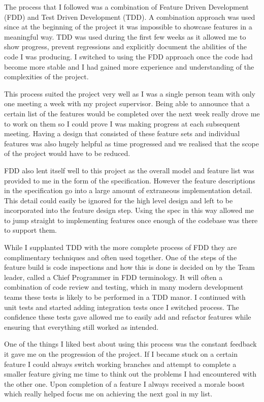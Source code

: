 The process that I followed was a combination of Feature Driven Development (FDD) and Test Driven Development (TDD).
A combination approach was used since at the beginning of the project it was impossible to showcase features in a meaningful way.
TDD was used during the first few weeks as it allowed me to show progress, prevent regressions and explicitly document the abilities of the code I was producing.
I switched to using the FDD approach once the code had become more stable and I had gained more experience and understanding of the complexities of the project.

This process suited the project very well as I was a single person team with only one meeting a week with my project supervisor.
Being able to announce that a certain list of the features would be completed over the next week really drove me to work on them so I could prove I was making progress at each subsequent meeting.
Having a design that consisted of these feature sets and individual features was also hugely helpful as time progressed and we realised that the scope of the project would have to be reduced.

FDD also lent itself well to this project as the overall model and feature list was provided to me in the form of the specification.
However the feature descriptions in the specification go into a large amount of extraneous implementation detail.
This detail could easily be ignored for the high level design and left to be incorporated into the feature design step.
Using the spec in this way allowed me to jump straight to implementing features once enough of the codebase was there to support them.

While I supplanted TDD with the more complete process of FDD they are complimentary techniques and often used together.
One of the steps of the feature build is code inspections and how this is done is decided on by the Team leader, called a Chief Programmer in FDD terminology.
It will often a combination of code review and testing, which in many modern development teams these tests is likely to be performed in a TDD manor.
I continued with unit tests and started adding integration tests once I switched process.
The confidence these tests gave allowed me to easily add and refactor features while ensuring that everything still worked as intended.  

One of the things I liked best about using this process was the constant feedback it gave me on the progression of the project.
If I became stuck on a certain feature I could always switch working branches and attempt to complete a smaller feature giving me time to think out the problems I had encountered with the other one.
Upon completion of a feature I always received a morale boost which really helped focus me on achieving the next goal in my list\cite{GETTING-REAL}.

